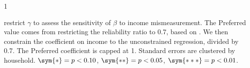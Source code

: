 \begin{table}[]
\begin{spacing}{1}
\begin{tablenotes}
  restrict $\gamma$ to assess the
  sensitivity of $\beta$ to income mismeasurement. The Preferred value
  comes from restricting the reliability ratio to 0.7, based on \citet{abowd2013estimating}. We then
  constrain the coefficient on income to the unconstrained regression,
  divided by 0.7. The Preferred coefficient is capped at 1.  Standard errors are clustered by household.  $\sym{*} = p < 0.10$, $\sym{**} = p < 0.05$, $\sym{***} = p < 0.01$.       \end{tablenotes}
           \end{spacing}
\end{table}
